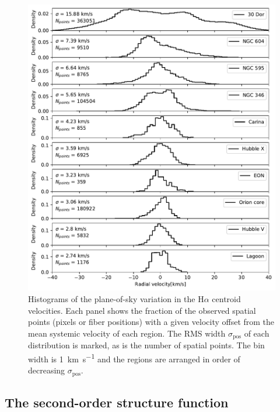 \documentclass[fleqn,usenatbib, useAMS, a4paper]{mnras}
\newcommand\pos{\ensuremath{_{\mathrm{pos}}}}
\newcommand\ha{\ensuremath{\text{H}\alpha}}
\begin{document}
\begin{figure}
 \centering
 \includegraphics[width=5in]{Figures/Hist}\par
 \caption{
   Histograms of the plane-of-sky variation in the \ha{} centroid velocities.
   Each panel shows the fraction of the observed spatial points
   (pixels or fiber positions)
   with a given velocity offset from the mean systemic velocity of each region.
   The RMS width \(\sigma\pos\) of each distribution is marked,
   as is the number of spatial points.
   The bin width is \SI{1}{km.s^{-1}} and the regions are arranged
   in order of decreasing \(\sigma\pos\).
 }
 \label{fig:hist}
\end{figure}


\subsection{The second-order structure function}
\label{sec:second-order-struct}
\end{document}
